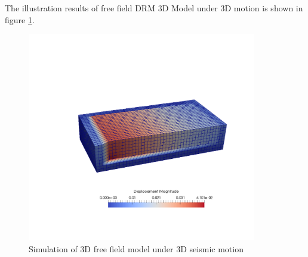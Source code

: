 The illustration results of free field DRM 3D Model under 3D motion is shown in figure \ref{3D_free_field_model_under_3D_motion}. 

\begin{figure}[H]
  \centering
  \includegraphics[width = 10cm]{./Figure-files/Day2/Apply_3D_Motions_from_SW4/Free_fields_3D_model_with_DRM/Free_field_model_3D_motion.pdf}
  \caption{Simulation of 3D free field model under 3D seismic motion}
  \label{3D_free_field_model_under_3D_motion}
\end{figure}






